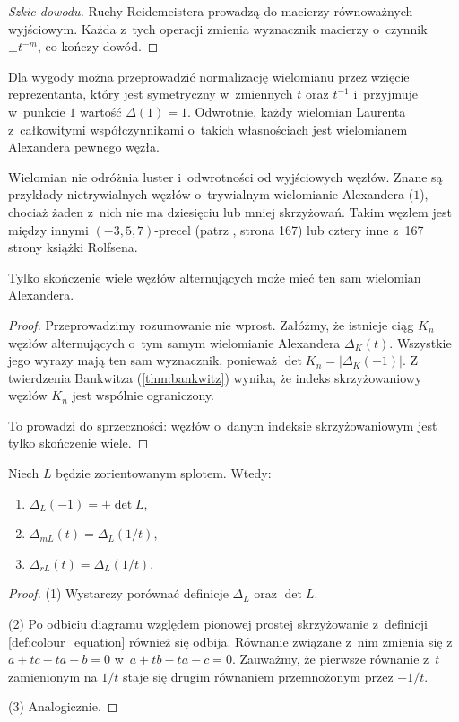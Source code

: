 \begin{proof}[Szkic dowodu]
	Ruchy Reidemeistera prowadzą do macierzy równoważnych wyjściowym.
	Każda z~tych operacji zmienia wyznacznik macierzy o~czynnik $\pm t^{-m}$, co kończy dowód.
\end{proof}

Dla wygody można przeprowadzić normalizację wielomianu przez wzięcie reprezentanta, który jest symetryczny w~zmiennych $t$ oraz $t^{-1}$ i~przyjmuje w~punkcie $1$ wartość $\Delta(1) = 1$.
Odwrotnie, każdy wielomian Laurenta z~całkowitymi współczynnikami o~takich własnościach jest wielomianem Alexandera pewnego węzła.

Wielomian nie odróżnia luster i~odwrotności od wyjściowych węzłów.
Znane są przykłady nietrywialnych węzłów o~trywialnym wielomianie Alexandera ($1$), chociaż żaden z~nich nie ma dziesięciu lub mniej skrzyżowań.
Takim węzłem jest między innymi  $(-3, 5, 7)$-precel (patrz \cite{adams94}, strona 167) lub cztery inne z~167 strony książki \cite{rolfsen76} Rolfsena.

\begin{proposition}
	Tylko skończenie wiele węzłów alternujących może mieć ten sam wielomian Alexandera.
\end{proposition}

\begin{proof}
	Przeprowadzimy rozumowanie nie wprost.
	Załóżmy, że istnieje ciąg $K_n$ węzłów alternujących o~tym samym wielomianie Alexandera $\Delta_K(t)$.
	Wszystkie jego wyrazy mają ten sam wyznacznik, ponieważ $\det K_n = |\Delta_K(-1)|$.
	Z twierdzenia Bankwitza (\ref{thm:bankwitz}) wynika, że indeks skrzyżowaniowy węzłów $K_n$ jest wspólnie ograniczony.

	To prowadzi do sprzeczności: węzłów o~danym indeksie skrzyżowaniowym jest tylko skończenie wiele.
\end{proof}

\begin{proposition}
	Niech $L$ będzie zorientowanym splotem.
	Wtedy:
	\begin{enumerate}
		\item $\Delta_L(-1) = \pm \det L$,
		\item $\Delta_{mL}(t) = \Delta_L(1/t)$,
		\item $\Delta_{rL}(t) = \Delta_L(1/t)$.
	\end{enumerate}
\end{proposition}

\begin{proof}
	(1) Wystarczy porównać definicje $\Delta_L$ oraz $\det L$.

	(2) Po odbiciu diagramu względem pionowej prostej skrzyżowanie z~definicji \ref{def:colour_equation} również się odbija.
	Równanie związane z~nim zmienia się z~$a + tc - ta - b = 0$ w~$a + tb - ta - c = 0$.
	Zauważmy, że pierwsze równanie z~$t$ zamienionym na $1/t$ staje się drugim równaniem przemnożonym przez $-1/t$.

	(3) Analogicznie.
\end{proof}

